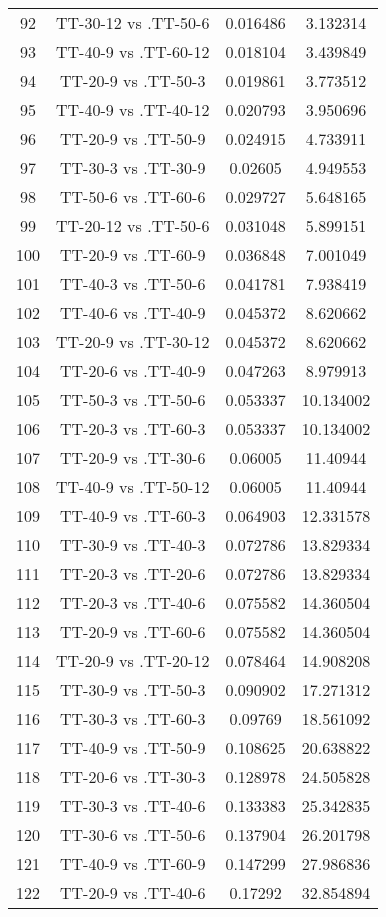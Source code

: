 \documentclass[a4paper,10pt]{article}
\begin{document}
\begin{landscape}
\begin{table}[!htp]
\begin{tabular}{cccc}
92&TT-30-12 vs .TT-50-6&0.016486&3.132314\\
93&TT-40-9 vs .TT-60-12&0.018104&3.439849\\
94&TT-20-9 vs .TT-50-3&0.019861&3.773512\\
95&TT-40-9 vs .TT-40-12&0.020793&3.950696\\
96&TT-20-9 vs .TT-50-9&0.024915&4.733911\\
97&TT-30-3 vs .TT-30-9&0.02605&4.949553\\
98&TT-50-6 vs .TT-60-6&0.029727&5.648165\\
99&TT-20-12 vs .TT-50-6&0.031048&5.899151\\
100&TT-20-9 vs .TT-60-9&0.036848&7.001049\\
101&TT-40-3 vs .TT-50-6&0.041781&7.938419\\
102&TT-40-6 vs .TT-40-9&0.045372&8.620662\\
103&TT-20-9 vs .TT-30-12&0.045372&8.620662\\
104&TT-20-6 vs .TT-40-9&0.047263&8.979913\\
105&TT-50-3 vs .TT-50-6&0.053337&10.134002\\
106&TT-20-3 vs .TT-60-3&0.053337&10.134002\\
107&TT-20-9 vs .TT-30-6&0.06005&11.40944\\
108&TT-40-9 vs .TT-50-12&0.06005&11.40944\\
109&TT-40-9 vs .TT-60-3&0.064903&12.331578\\
110&TT-30-9 vs .TT-40-3&0.072786&13.829334\\
111&TT-20-3 vs .TT-20-6&0.072786&13.829334\\
112&TT-20-3 vs .TT-40-6&0.075582&14.360504\\
113&TT-20-9 vs .TT-60-6&0.075582&14.360504\\
114&TT-20-9 vs .TT-20-12&0.078464&14.908208\\
115&TT-30-9 vs .TT-50-3&0.090902&17.271312\\
116&TT-30-3 vs .TT-60-3&0.09769&18.561092\\
117&TT-40-9 vs .TT-50-9&0.108625&20.638822\\
118&TT-20-6 vs .TT-30-3&0.128978&24.505828\\
119&TT-30-3 vs .TT-40-6&0.133383&25.342835\\
120&TT-30-6 vs .TT-50-6&0.137904&26.201798\\
121&TT-40-9 vs .TT-60-9&0.147299&27.986836\\
122&TT-20-9 vs .TT-40-6&0.17292&32.854894\\

\end{tabular}
\end{table}
\end{landscape}
\end{document}
